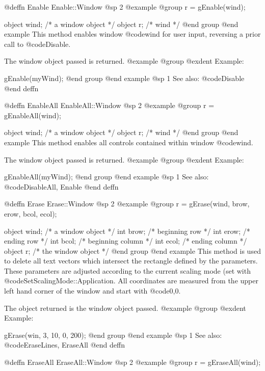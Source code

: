 @deffn {Enable} Enable::Window
@sp 2
@example
@group
r = gEnable(wind);

object  wind;   /*  a window object  */
object  r;      /*  wind             */
@end group
@end example
This method enables window @code{wind} for user input, reversing
a prior call to @code{Disable}.

The window object passed is returned.
@example
@group
@exdent Example:

gEnable(myWind);
@end group
@end example
@sp 1
See also:  @code{Disable}
@end deffn




@deffn {EnableAll} EnableAll::Window
@sp 2
@example
@group
r = gEnableAll(wind);

object  wind;   /*  a window object  */
object  r;      /*  wind             */
@end group
@end example
This method enables all controls contained within window
@code{wind}.

The window object passed is returned.
@example
@group
@exdent Example:

gEnableAll(myWind);
@end group
@end example
@sp 1
See also:  @code{DisableAll, Enable}
@end deffn




@deffn {Erase} Erase::Window
@sp 2
@example
@group
r = gErase(wind, brow, erow, bcol, ecol);

object  wind;   /*  a window object     */
int     brow;   /*  beginning row       */
int     erow;   /*  ending row          */
int     bcol;   /*  beginning column    */
int     ecol;   /*  ending column       */
object  r;      /*  the window object   */
@end group
@end example
This method is used to delete all text vectors which intersect the
rectangle defined by the parameters.  These parameters are adjusted
according to the current scaling mode (set with
@code{SetScalingMode::Application}.  All coordinates are measured from
the upper left hand corner of the window and start with @code{0,0}.

The object returned is the window object passed.
@example
@group
@exdent Example:

gErase(win, 3, 10, 0, 200);
@end group
@end example
@sp 1
See also:  @code{EraseLines, EraseAll}
@end deffn










@deffn {EraseAll} EraseAll::Window
@sp 2
@example
@group
r = gEraseAll(wind);

